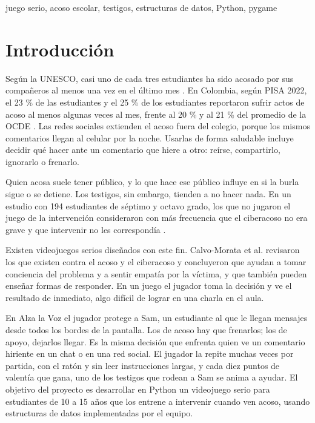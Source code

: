 \documentclass[conference]{IEEEtran}
\begin{document}
\begin{IEEEkeywords}juego serio, acoso escolar, testigos, estructuras de datos, Python, pygame\end{IEEEkeywords}

\section{Introducción}

Según la UNESCO, casi uno de cada tres estudiantes ha sido acosado por sus compañeros al menos una vez en el último mes \cite{ref1}. En Colombia, según PISA 2022, el 23 \% de las estudiantes y el 25 \% de los estudiantes reportaron sufrir actos de acoso al menos algunas veces al mes, frente al 20 \% y al 21 \% del promedio de la OCDE \cite{ref2}. Las redes sociales extienden el acoso fuera del colegio, porque los mismos comentarios llegan al celular por la noche. Usarlas de forma saludable incluye decidir qué hacer ante un comentario que hiere a otro: reírse, compartirlo, ignorarlo o frenarlo.

Quien acosa suele tener público, y lo que hace ese público influye en si la burla sigue o se detiene. Los testigos, sin embargo, tienden a no hacer nada. En un estudio con 194 estudiantes de séptimo y octavo grado, los que no jugaron el juego de la intervención consideraron con más frecuencia que el ciberacoso no era grave y que intervenir no les correspondía \cite{ref3}.

Existen videojuegos serios diseñados con este fin. Calvo-Morata et al. \cite{ref4} revisaron los que existen contra el acoso y el ciberacoso y concluyeron que ayudan a tomar conciencia del problema y a sentir empatía por la víctima, y que también pueden enseñar formas de responder. En un juego el jugador toma la decisión y ve el resultado de inmediato, algo difícil de lograr en una charla en el aula.

En Alza la Voz el jugador protege a Sam, un estudiante al que le llegan mensajes desde todos los bordes de la pantalla. Los de acoso hay que frenarlos; los de apoyo, dejarlos llegar. Es la misma decisión que enfrenta quien ve un comentario hiriente en un chat o en una red social. El jugador la repite muchas veces por partida, con el ratón y sin leer instrucciones largas, y cada diez puntos de valentía que gana, uno de los testigos que rodean a Sam se anima a ayudar. El objetivo del proyecto es desarrollar en Python un videojuego serio para estudiantes de 10 a 15 años que los entrene a intervenir cuando ven acoso, usando estructuras de datos implementadas por el equipo.
\end{document}

